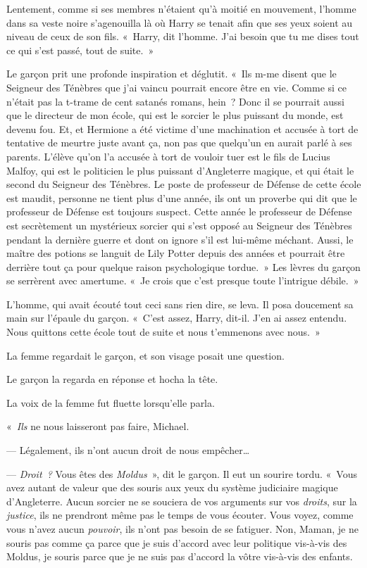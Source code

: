 Lentement, comme si ses membres n'étaient qu'à moitié en mouvement, l'homme dans sa veste noire s'agenouilla là où Harry se tenait afin que ses yeux soient au niveau de ceux de son fils. «~Harry, dit l'homme. J'ai besoin que tu me dises tout ce qui s'est passé, tout de suite.~»

Le garçon prit une profonde inspiration et déglutit. «~Ils m-me disent que le Seigneur des Ténèbres que j'ai vaincu pourrait encore être en vie. Comme si ce n'était pas la t-trame de cent satanés romans, hein~? Donc il se pourrait aussi que le directeur de mon école, qui est le sorcier le plus puissant du monde, est devenu fou. Et, et Hermione a été victime d'une machination et accusée à tort de tentative de meurtre juste avant ça, non pas que quelqu'un en aurait parlé à ses parents. L'élève qu'on l'a accusée à tort de vouloir tuer est le fils de Lucius Malfoy, qui est le politicien le plus puissant d'Angleterre magique, et qui était le second du Seigneur des Ténèbres. Le poste de professeur de Défense de cette école est maudit, personne ne tient plus d'une année, ils ont un proverbe qui dit que le professeur de Défense est toujours suspect. Cette année le professeur de Défense est secrètement un mystérieux sorcier qui s'est opposé au Seigneur des Ténèbres pendant la dernière guerre et dont on ignore s'il est lui-même méchant. Aussi, le maître des potions se languit de Lily Potter depuis des années et pourrait être derrière tout ça pour quelque raison psychologique tordue.~» Les lèvres du garçon se serrèrent avec amertume. «~Je crois que c'est presque toute l'intrigue débile.~»

L'homme, qui avait écouté tout ceci sans rien dire, se leva. Il posa doucement sa main sur l'épaule du garçon. «~C'est assez, Harry, dit-il. J'en ai assez entendu. Nous quittons cette école tout de suite et nous t'emmenons avec nous.~»

La femme regardait le garçon, et son visage posait une question.

Le garçon la regarda en réponse et hocha la tête.

La voix de la femme fut fluette lorsqu'elle parla.

«~\emph{Ils} ne nous laisseront pas faire, Michael.

--- Légalement, ils n'ont aucun droit de nous empêcher…

--- \emph{Droit~?} Vous êtes des \emph{Moldus}~», dit le garçon. Il eut un sourire tordu. «~Vous avez autant de valeur que des souris aux yeux du système judiciaire magique d'Angleterre. Aucun sorcier ne se souciera de vos arguments sur vos \emph{droits}, sur la \emph{justice}, ils ne prendront même pas le temps de vous écouter. Vous voyez, comme vous n'avez aucun \emph{pouvoir}, ils n'ont pas besoin de se fatiguer. Non, Maman, je ne souris pas comme ça parce que je suis d'accord avec leur politique vis-à-vis des Moldus, je souris parce que je ne suis pas d'accord la vôtre vis-à-vis des enfants.

